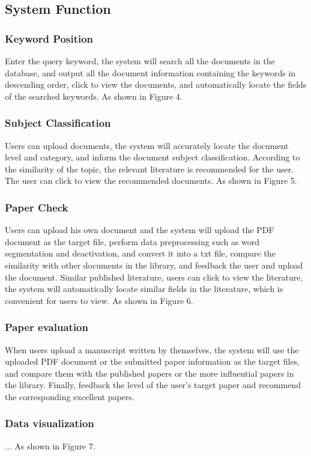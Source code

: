 \subsection{System Function}
\subsubsection{Keyword Position}
Enter the query keyword, the system will search all the documents in the database, and output all the document information containing the keywords in descending order, click to view the documents, and automatically locate the fields of the searched keywords. As shown in Figure 4.

\subsubsection{Subject Classification}
Users can upload documents, the system will accurately locate the document level and category, and inform the document subject classification. According to the similarity of the topic, the relevant literature is recommended for the user. The user can click to view the recommended documents. As shown in Figure 5.

\subsubsection{Paper Check}
Users can upload his own document and the system will upload the PDF document as the target file, perform data preprocessing such as word segmentation and deactivation, and convert it into a txt file, compare the similarity with other documents in the library, and feedback the user and upload the document. Similar published literature, users can click to view the literature, the system will automatically locate similar fields in the literature, which is convenient for users to view. As shown in Figure 6.

\subsubsection{Paper evaluation}
When users upload a manuscript written by themselves, the system will use the uploaded PDF document or the submitted paper information as the target files,  and compare them with the published papers or the more influential papers in the library. Finally, feedback the level of the user's target paper and recommend the corresponding excellent papers.

\subsubsection{Data visualization}
... As shown in Figure 7.


